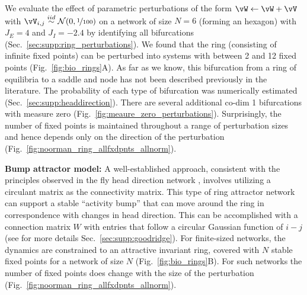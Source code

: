 \documentclass{article} %
\newcommand{\ptitle}[1]{\textbf{#1:}\xspace}
\newcounter{ct}
\newcommand{\iidsample}{\stackrel{iid}{\sim}}
\theoremstyle{definition}
\theoremstyle{remark}
\begin{document}
We evaluate the effect of parametric perturbations of the form \( \vW \leftarrow \vW + \vV\) with \(\vV_{i, j}\iidsample\mathcal{N}(0,\nicefrac{1}{100})\) on a network of size \(N = 6\) (forming an hexagon) with \(J_{E} = 4\) and \(J_{I}=-2.4\) by identifying all bifurcations (Sec.~\ref{sec:supp:ring_perturbations}).
We found that the ring (consisting of infinite fixed points) can be perturbed into systems with between 2 and 12 fixed points (Fig.~\ref{fig:bio_rings}A).
As far as we know, this bifurcation from a ring of equilibria to a saddle and node has not been described previously in the literature.
The probability of each type of bifurcation was numerically estimated (Sec.~\ref{sec:supp:headdirection}).
There are several additional co-dim 1 bifurcations with measure zero (Fig.~\ref{fig:meaure_zero_perturbations}).
Surprisingly, the number of fixed points is maintained throughout a range of perturbation sizes and hence depends only on the direction of the perturbation (Fig.~\ref{fig:noorman_ring_allfxdpnts_allnorm}).


\ptitle{Bump attractor model}
A well-established approach, consistent with the principles observed in the fly head direction network \citep{kakaria2017}, involves utilizing a circulant matrix as the connectivity matrix\citep{benyishai1995theory,samsonovich1997path}.
This type of ring attractor network can support a stable ``activity bump'' that can move around the ring in correspondence with changes in head direction.
This can be accomplished with a connection matrix \(W\) with entries that follow a circular Gaussian function of \(i - j\) \citep{seeholzer2017efficient,redish1996coupled,goodridge2000,compte2000synaptic} (see for more details Sec.~\ref{sec:supp:goodridge}).
For finite-sized networks, the dynamics are constrained to an attractive invariant ring, covered with \(N\) stable fixed points for a network of size \(N\) (Fig.~\ref{fig:bio_rings}B).
For such networks the number of fixed points does change with the size of the perturbation (Fig.~\ref{fig:noorman_ring_allfxdpnts_allnorm}).
\end{document}
